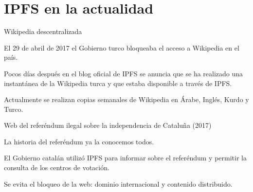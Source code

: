 \documentclass[spanish]{beamer}
\begin{document}

\section{IPFS en la actualidad} %
\label{sec:la_web_distribuida_en_la_actualidad}

\begin{frame}{Wikipedia descentralizada}
  
  El 29 de abril de 2017 el Gobierno turco bloqueaba el acceso a Wikipedia en el país.

  Pocos días después en el blog oficial de IPFS se anuncia que se ha realizado una instantánea de la Wikipedia turca y que estaba disponible a través de IPFS.

  Actualmente se realizan copias semanales de Wikipedia en Árabe, Inglés, Kurdo y Turco.

\end{frame}

\begin{frame}{Web del referéndum ilegal sobre la independencia de Cataluña (2017)}
  
  La historia del referéndum ya la conocemos todos.

  El Gobierno catalán utilizó IPFS para informar sobre el referéndum y permitir la consulta de los centros de votación.

  Se evita el bloqueo de la web: dominio internacional y contenido distribuido.

\end{frame}

\end{document}
